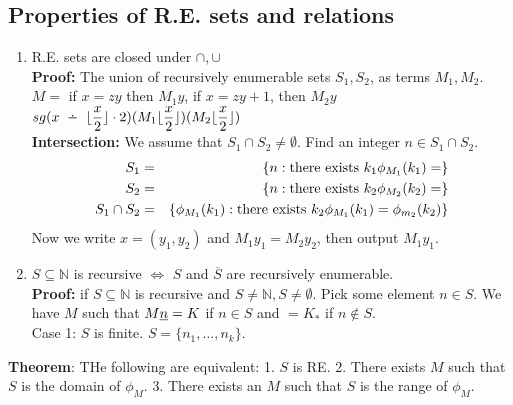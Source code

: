 \subsection{Properties of R.E. sets and relations}
\begin{enumerate}[(1)]
  \item R.E. sets are closed under $\cap,\cup$\\
    \textbf{Proof:} The union of recursively enumerable sets $S_1,S_2$, as terms $M_1,M_2$. $M =$ if $x = zy$ then $M_1y$, if $x = zy + 1$, then $M_2y$\\
    $sg(x \monus \lfloor\dfrac{x}{2}\rfloor \cdot 2)(M_1\lfloor\dfrac{x}{2}\rfloor)(M_2\lfloor\dfrac{x}{2}\rfloor)$\\
  \textbf{Intersection:} We assume that $S_1 \cap S_2 \not= \emptyset$. Find an integer $n \in S_1 \cap S_2$.\\
    \begin{eqnarray*}
      S_1 &=& \{n : \hbox{there exists }k_1\phi_{M_1}(k_1) = \}\\
      S_2 &=& \{n : \hbox{there exists }k_2\phi_{M_2}(k_2) = \}\\
      S_1 \cap S_2 &=& \{\phi_{M_1}(k_1) : \hbox{there exists }k_2\phi_{M_1}(k_1) = \phi_{m_2}(k_2)\}
    \end{eqnarray*}
    Now we write $x = (y_1,y_2)$ and $M_1y_1 = M_2y_2$, then output $M_1y_1$.
  \item $S \subseteq \mathbb{N}$ is recursive $\Leftrightarrow$ $S$ and $\overline{S}$ are recursively enumerable.\\
    \textbf{Proof:} if $S \subseteq \mathbb{N}$ is recursive and $S \not= \mathbb{N}, S \not= \emptyset$. Pick some element $n \in S$. We have $M$ such that $M\uline{n} = K$ if $n \in S$ and $= K_*$ if $n \not\in S$.\\
    Case 1: $S$ is finite. $S = \{n_1,\ldots,n_k\}$.
\end{enumerate}
\textbf{Theorem}: THe following are equivalent: 1. $S $ is RE. 2. There exists $M$ such that $S$ is the domain of $\phi_M$. 3. There exists an $M$ such that $S$ is the range of $\phi_M$.
